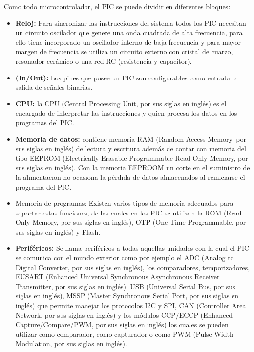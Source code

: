 Como todo microcontrolador, el PIC se puede dividir en diferentes bloques:
\begin {itemize}

\item {\textbf{Reloj:}}  Para sincronizar las instrucciones del sistema todos los PIC necesitan un circuito oscilador que genere una onda cuadrada de alta frecuencia, para ello tiene incorporado un oscilador interno de baja frecuencia y para mayor margen de frecuencia se utiliza un circuito externo con cristal de cuarzo, resonador cerámico o una red RC (resistencia y capacitor). 
\item {\textbf{(In/Out):}} Los  pines que posee un PIC son configurables como entrada o salida de señales binarias.
\item {\textbf{CPU:}} la CPU (Central Processing Unit, por sus siglas en inglés) es el encargado de interpretar las instrucciones y quien procesa los datos en los programas del PIC. 
\item {\textbf{Memoria de datos:}} contiene memoria RAM (Random Access Memory, por sus siglas en inglés) de lectura y escritura además de contar con memoria del tipo EEPROM (Electrically-Erasable Programmable Read-Only Memory, por sus siglas en inglés). Con la memoria EEPROOM un corte en el suministro de la alimentacion no ocasiona la pérdida de datos almacenados al reiniciarse el programa del PIC. 
\item {\textbf{}{Memoria de programas:}} Existen varios tipos de memoria adecuados para soportar estas funciones, de las cuales en los PIC se utilizan la ROM (Read-Only Memory, por sus siglas en inglés), OTP (One-Time Programmable, por sus siglas en inglés) y Flash. 
\item {\textbf{Periféricos:}} Se llama periféricos a todas aquellas unidades con la cual el PIC se comunica con el mundo exterior como por ejemplo el  ADC (Analog to Digital Converter, por sus siglas en inglés),  los comparadores, temporizadores, EUSART (Enhanced Universal Synchronous Asynchronous Receiver Transmitter, por sus siglas en inglés), USB (Universal Serial Bus, por sus siglas en inglés), MSSP (Master Synchronous Serial Port, por sus siglas en inglés) que permite manejar los protocolos I2C y SPI, CAN (Controller Area Network, por sus siglas en inglés) y los módulos CCP/ECCP (Enhanced Capture/Compare/PWM, por sus siglas en inglés) los cuales se pueden utilizar como comparador, como capturador o como PWM (Pulse-Width Modulation, por sus siglas en inglés).
\end{itemize}

